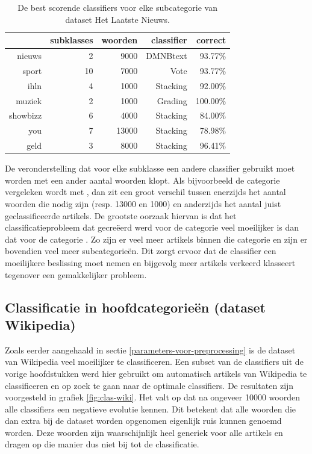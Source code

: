 \begin{table}[htbp]
  \centering
  \caption{De best scorende classifiers voor elke subcategorie van dataset Het Laatste Nieuws.}
    \begin{tabular}{rrrrr}
    \toprule
          & subklasses & woorden  & classifier & correct \\
    \midrule
    nieuws & 2 & 9000  & DMNBtext & 93.77\% \\
    sport & 10 & 7000  & Vote  & 93.77\% \\
    ihln  & 4 & 1000  & Stacking & 92.00\% \\
    muziek & 2 & 1000  & Grading & 100.00\% \\
    showbizz & 6 & 4000  & Stacking & 84.00\% \\
    you   & 7 & 13000 & Stacking & 78.98\% \\
    geld  & 3 & 8000  & Stacking & 96.41\% \\
    \bottomrule
    \end{tabular}%
  \label{tab:classify-sub}%
\end{table}%

De veronderstelling dat voor elke subklasse een andere classifier gebruikt moet worden met een ander aantal woorden klopt. Als bijvoorbeeld de categorie  vergeleken wordt met , dan zit een groot verschil tussen enerzijds het aantal woorden die nodig zijn (resp. 13000 en 1000) en anderzijds het aantal juist geclassificeerde artikels. De grootste oorzaak hiervan is dat het classificatieprobleem dat gecre\"eerd werd voor de categorie  veel moeilijker is dan dat voor de categorie . Zo zijn er veel meer artikels binnen die categorie en zijn er bovendien veel meer subcategorie\"en. Dit zorgt ervoor dat de classifier een moeilijkere beslissing moet nemen en bijgevolg meer artikels verkeerd klasseert tegenover een gemakkelijker probleem. 

\subsection{Classificatie in hoofdcategorie\"en (dataset Wikipedia)}\label{clas:wiki}
Zoals eerder aangehaald in sectie \ref{parameters-voor-preprocessing} is de dataset van Wikipedia veel moeilijker te classificeren. Een subset van de classifiers uit de vorige hoofdstukken werd hier gebruikt om automatisch artikels van Wikipedia te classificeren en op zoek te gaan naar de optimale classifiers. De resultaten zijn voorgesteld in grafiek \ref{fig:clas-wiki}. Het valt op dat na ongeveer 10000 woorden alle classifiers een negatieve evolutie kennen. Dit betekent dat alle woorden die dan extra bij de dataset worden opgenomen eigenlijk ruis kunnen genoemd worden. Deze woorden zijn waarschijnlijk heel generiek voor alle artikels en dragen op die manier dus niet bij tot de classificatie. 
 
